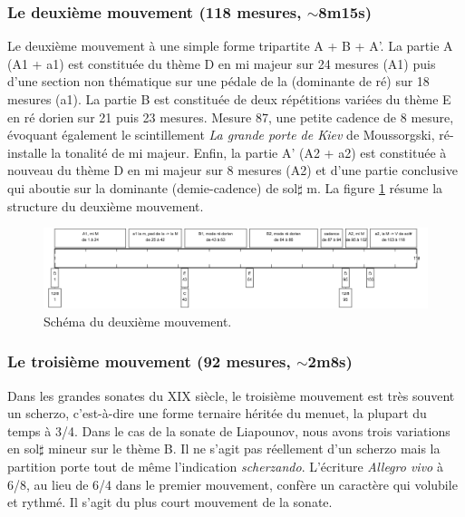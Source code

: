 \subsubsection*{Le deuxième mouvement (118 mesures, $\sim$8m15s)}

Le deuxième mouvement à une simple forme tripartite A + B + A'. La partie A (A1 + a1) est constituée du thème D en mi majeur sur 24 mesures (A1) puis d'une section non thématique sur une pédale de la (dominante de ré) sur 18 mesures (a1). La partie B est constituée de deux répétitions variées du thème E en ré dorien sur 21 puis 23 mesures. Mesure 87, une petite cadence de 8 mesure, évoquant également le scintillement \emph{La grande porte de Kiev} de Moussorgski, ré-installe la tonalité de mi majeur. Enfin, la partie A' (A2 + a2) est constituée à nouveau du thème D en mi majeur sur 8 mesures (A2) et d'une partie conclusive qui aboutie sur la dominante (demie-cadence) de sol$\sharp$ m. La figure \ref{schema-2} résume la structure du deuxième mouvement.

\begin{figure}[!ht]
  \begin{bigcenter}
    \includegraphics[width=17.5cm, keepaspectratio]{frise-mvt2.png}
  \end{bigcenter}
  \caption{\label{schema-2}Schéma du deuxième mouvement.}
\end{figure}

\subsubsection*{Le troisième mouvement (92 mesures, $\sim$2m8s)}

Dans les grandes sonates du XIX\ieme{} siècle, le troisième mouvement est très souvent un scherzo, c'est-à-dire une forme ternaire héritée du menuet, la plupart du temps à 3/4. Dans le cas de la sonate de Liapounov, nous avons trois variations en sol$\sharp$ mineur sur le thème B. Il ne s'agit pas réellement d'un scherzo mais la partition porte tout de même l'indication \emph{scherzando}. L'écriture \emph{Allegro vivo} à 6/8, au lieu de 6/4 dans le premier mouvement, confère un caractère qui volubile et rythmé. Il s'agit du plus court mouvement de la sonate.

